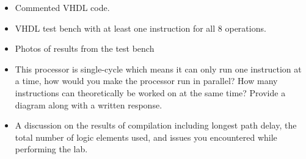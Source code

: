 \begin{itemize}
	\item Commented VHDL code.
	\item VHDL test bench with at least one instruction for all 8 operations.
	\item Photos of results from the test bench
	\item This processor is single-cycle which means it can only run one instruction at a time, how would you make the processor run in parallel? How many instructions can theoretically be worked on at the same time? Provide a diagram along with a written response.
	\item A discussion on the results of compilation including longest path delay, the total number of logic elements used, and issues you encountered while performing the lab.
\end{itemize}